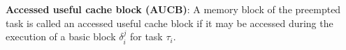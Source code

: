 
\begin{definition}
\textbf{Accessed useful cache block (AUCB)}: A memory block of the preempted task is called an accessed useful cache block if it may be accessed during the execution of a basic block \begin{math}\delta_{i}^{j}\end{math} for task \begin{math}\tau_{i}\end{math}.
\end{definition}

